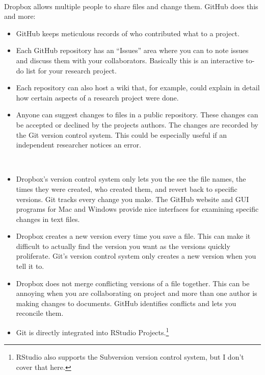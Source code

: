        
 \\[0.25cm]

Dropbox allows multiple people to share files and change them. GitHub does this and more:

\begin{itemize}
        \item GitHub keeps meticulous records of who contributed what to a project.
        \item Each GitHub repository has an ``Issues'' area where you can to note issues and discuss them with your collaborators. Basically this is an interactive to-do list for your research project.
        \item Each repository can also host a wiki that, for example, could explain in detail how certain aspects of a research project were done.
        \item Anyone can suggest changes to files in a public repository. These changes can be accepted or declined by the projects authors. The changes are recorded by the Git version control system. This could be especially useful if an independent researcher notices an error. 
\end{itemize}\\[0.25cm]

\begin{itemize}
\item
  Dropbox's version control system only lets you the see the file names, the times they were created, who created them, and revert back to specific versions. Git tracks every change you make. The GitHub website and GUI programs for Mac and Windows provide nice interfaces for examining specific changes in text files.
\item
  Dropbox creates a new version every time you save a file. This can make it difficult to actually find the version you want as the versions quickly proliferate. Git's version control system only creates a new version when you tell it to.
\item
  Dropbox does not merge conflicting versions of a file together. This can be annoying when you are collaborating on project and more than one author is making changes to documents. GitHub identifies conflicts and lets you reconcile them.
\item
  Git is directly integrated into RStudio Projects.\footnote{RStudio also supports the Subversion version
  control system, but I don't cover that here.}
\end{itemize}

